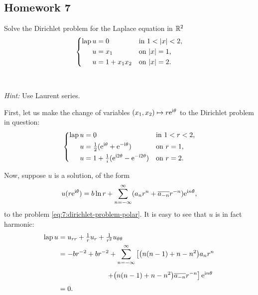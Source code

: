 \subsection{Homework 7}
\begin{problem}
  Solve the Dirichlet problem for the Laplace equation in \(\mathbb{R}^2\)
  \[
    \left\{
      \begin{aligned}
        \Lap u&=0&&\text{in \(1<|x|<2\),}\\
        u&=x_1&&\text{on \(|x|=1\),}\\
        u&=1+x_1x_2&&\text{on \(|x|=2\).}
      \end{aligned}
    \right.
  \]
  \\\\
  \emph{Hint:} Use Laurent series.
\end{problem}
\begin{solution*}
  First, let us make the change of variables \((x_1,x_2)\mapsto
  r\mathrm{e}^{\mathrm{i}\theta}\) to the Dirichlet problem in question:
  \begin{equation}
    \label{eq:7:dirichlet-problem-polar}
    \left\{
      \begin{aligned}
        \operatorname{lap} u&=0&&\text{in \(1<r<2\),}\\
        u&=\tfrac{1}{2}(\mathrm{e}^{\mathrm{i}\theta}+\mathrm{e}^{-\mathrm{i}\theta})&&\text{on \(r=1\),}\\
        u&=1+\tfrac{1}{i}(\mathrm{e}^{\mathrm{i} 2\theta}-\mathrm{e}^{-\mathrm{i} 2\theta})&&\text{on \(r=2\).}
      \end{aligned}
    \right.
  \end{equation}

  Now, suppose \(u\) is a solution, of the form
  \[
    u(r\rme^{\rmi\theta})=%
    b\ln r%
    +\sum_{n=-\infty}^\infty (a_nr^n+\overline{a_{-n}}r^{-n})\rme^{\rmi n\theta},
  \]
  to the problem \eqref{eq:7:dirichlet-problem-polar}. It is easy to see
  that \(u\) is in fact harmonic:
  \begin{align*}
    \Lap u%
    &=u_{rr}+\tfrac{1}{r}u_r+\tfrac{1}{r^2}u_{\theta\theta}\\
    &=-br^{-2}+br^{-2}+\sum_{n=-\infty}^\infty
      \left[\bigl(n(n-1)+n-n^2\bigr) a_nr^n\right.\\
    &\phantom{{}={}-\frac{b}{r^2}+\frac{b}{r^2}+}
      \left.+\bigl(n(n-1)+n-n^2\bigr)\overline{a_{-n}}r^{-n}\right]\rme^{\rmi
      n\theta}\\
    &=0.
  \end{align*}


\end{solution*}
